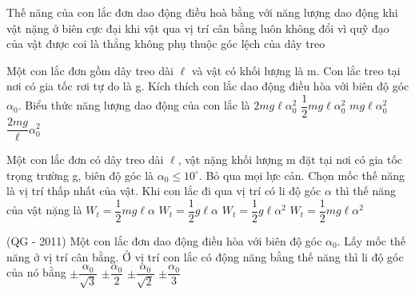 \begin{ex} %
Thế năng của con lắc đơn dao động điều hoà
\choice
{\True bằng với năng lượng dao động khi vật nặng ở biên}
{cực đại khi vật qua vị trí cân bằng}
{luôn không đổi vì quỹ đạo của vật được coi là thẳng}
{không phụ thuộc góc lệch của dây treo}
\end{ex} 
\begin{ex} %
Một con lắc đơn gồm dây treo dài $\ell$ và vật có khối lượng là m. Con lắc treo tại nơi có gia tốc rơi tự do là g. Kích thích con lắc dao động điều hòa với biên độ góc $\alpha _0.$ Biểu thức năng lượng dao động của con lắc là
\choice
{$2mg\ell\alpha _0^2$}
{\True $\dfrac{1}{2}{mg\ell}\alpha _0^2$}
{$mg\ell\alpha _0^2$}
{$\dfrac{2mg}{\ell}\alpha _0^2$}
\end{ex} 
\begin{ex} %
Một con lắc đơn có dây treo dài $\ell$, vật nặng khối lượng m đặt tại nơi có gia tốc trọng trường g, biên độ góc là $\alpha _0\leq 10^\circ$. Bỏ qua mọi lực cản. Chọn mốc thế năng là vị trí thấp nhất của vật. Khi con lắc đi qua vị trí có li độ góc $\alpha $ thì thế năng của vật nặng là
\choice
{$W_t=\dfrac{1}{2}{mg}\ell \alpha $}
{$W_t=\dfrac{1}{2}{g}\ell \alpha $}
{$W_t=\dfrac{1}{2}{g}\ell \alpha ^2$}
{\True $W_t=\dfrac{1}{2}{mg}\ell \alpha ^2$}
\end{ex} 
\begin{ex} %
(QG - 2011) Một con lắc đơn dao động điều hòa với biên độ góc $\alpha_0$. Lấy mốc thế năng ở vị trí cân bằng. Ở vị trí con lắc có động năng bằng thế năng thì li độ góc của nó bằng
\choice
{$\pm \dfrac{\alpha _0}{\sqrt{3}}$}
{$\pm \dfrac{\alpha _0}{2}$}
{\True $\pm \dfrac{\alpha _0}{\sqrt{2}}$}
{$\pm \dfrac{\alpha _0}{3}$}
\end{ex} 

